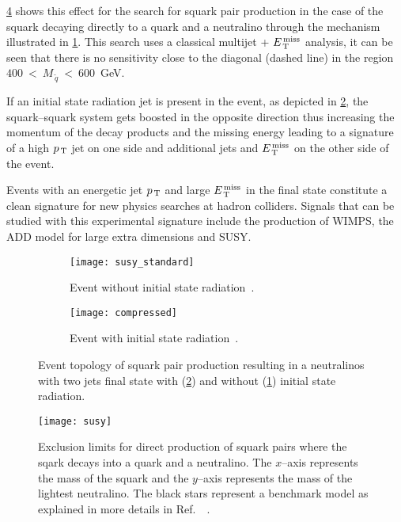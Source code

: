 \cref{fig:susy_exclusion} shows this effect for the search for squark pair
production in the case of the squark decaying directly to a quark and a
neutralino through the mechanism illustrated in \cref{fig:susy_standard}. This
search uses a classical multijet + $E_\mathrm{\, T}^\mathrm{\, miss}$ analysis, it can be seen that there is
no sensitivity close to the diagonal (dashed line) in the region
$400~<~M_{\, \tilde{q}}~<~600$~GeV.

If an initial state radiation jet is present in the event, as depicted in
\cref{fig:susy_compressed}, the squark--squark system gets boosted in the
opposite direction thus increasing the momentum of the decay products and the
missing energy leading to a signature of a high $p_\mathrm{\, T}$ jet on one side and
additional jets and $E_\mathrm{\, T}^\mathrm{\, miss}$ on the other side of the event.

Events with an energetic jet $p_\mathrm{\, T}$ and large $E_\mathrm{\, T}^\mathrm{\, miss}$ in the final state
constitute a clean signature for new physics searches at hadron colliders.
Signals that can be studied with this experimental signature include the
production of WIMPS, the ADD model for large extra dimensions and SUSY\@.
\begin{figure}[!h]
  \centering
  \begin{subfigure}[t]{.48\linewidth}
    \texttt{[image: susy\_standard]}
    \caption{Event without initial state radiation~\cite{SUSYPub}.}
    \label{fig:susy_standard}
  \end{subfigure} \quad
  \begin{subfigure}[t]{.48\linewidth}
    \texttt{[image: compressed]}
    \caption{Event with initial state radiation~\cite{ExotPub}.}
    \label{fig:susy_compressed}
  \end{subfigure}
  \caption{Event topology of squark pair production resulting in a neutralinos
    with two jets final state with (\cref{fig:susy_compressed}) and without
    (\cref{fig:susy_standard}) initial state radiation.}
  \label{fig:motivation}
\end{figure}
\begin{figure}[!htb]
  \centering
  \texttt{[image: susy]}
  \caption{Exclusion limits for direct production of squark
    pairs where the sqark decays into a quark and a neutralino. The $x$--axis
    represents the mass of the squark and the $y$--axis represents the mass of
    the lightest neutralino. The black stars represent a benchmark model as
    explained in more details in Ref.~~\cite{SUSYPub}.}
  \label{fig:susy_exclusion}
\end{figure}
